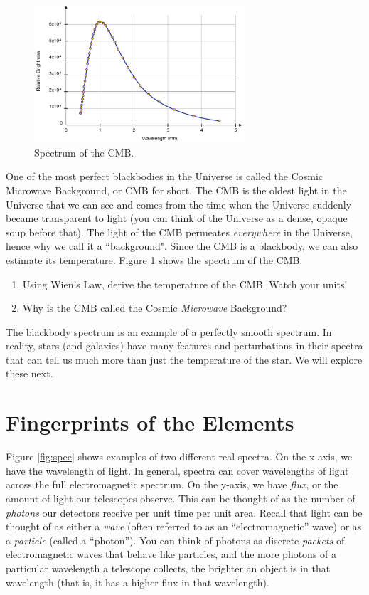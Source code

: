 \documentclass[11pt]{article}
\begin{document}
\begin{figure}[h!]
    \centering
    \includegraphics[width=0.7\textwidth]{Images/CMB.jpg}
    \caption{Spectrum of the CMB.}
    \label{fig:CMB}
\end{figure}

\medskip \noindent
One of the most perfect blackbodies in the Universe is called the Cosmic Microwave Background, or CMB for short.  The CMB is the oldest light in the Universe that we can see and comes from the time when the Universe suddenly became transparent to light (you can think of the Universe as a dense, opaque soup before that).  The light of the CMB permeates \textit{everywhere} in the Universe, hence why we call it a ``background".  Since the CMB is a blackbody, we can also estimate its temperature. Figure \ref{fig:CMB} shows the spectrum of the CMB.

\begin{enumerate}
    \item Using Wien's Law, derive the temperature of the CMB.  Watch your units!
    \item Why is the CMB called the Cosmic \textit{Microwave} Background?
\end{enumerate}

\medskip \noindent
The blackbody spectrum is an example of a perfectly smooth spectrum. In reality, stars (and galaxies) have many features and perturbations in their spectra that can tell us much more than just the temperature of the star.  We will explore these next.

\section{Fingerprints of the Elements}

\noindent
Figure \ref{fig:spec} shows examples of two different real spectra.  On the x-axis, we have the wavelength of light.  In general, spectra can cover wavelengths of light across the full electromagnetic spectrum.  On the y-axis, we have \textit{flux}, or the amount of light our telescopes observe. This can be thought of as the number of \textit{photons} our detectors receive per unit time per unit area.  Recall that light can be thought of as either a \emph{wave} (often referred to as an ``electromagnetic'' wave) or as a \emph{particle} (called a ``photon'').  You can think of photons as discrete \textit{packets} of electromagnetic waves that behave like particles, and the more photons of a particular wavelength a telescope collects, the brighter an object is in that wavelength (that is, it has a higher flux in that wavelength).
\end{document}
